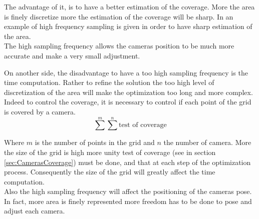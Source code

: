 %
The advantage of it, is to have a better estimation of the coverage. More the area is finely discretize more the estimation of the coverage will be sharp. In \citep{171*horster2006} an example of high frequency sampling is given in order to have sharp estimation of the area. \\
The high sampling frequency allows the cameras position to be much more accurate and make a very small adjustment.


On another side, the disadvantage to have a too high sampling frequency is the time computation. Rather to refine the solution the too high level of discretization of the area will make the optimization too long and more complex. Indeed to control the coverage, it is necessary to control if each point of the grid is covered by a camera.  
\begin{equation} 
	\sum^m \sum^n \mbox{test of coverage}
\end{equation}

Where $m$ is the number of points in the grid and $n$ the number of camera. 
 More the size of the grid is high more unity test of coverage (see in section \ref{sec:CamerasCoverage}) must be done, and that at each step of the optimization process.  Consequently the size of the grid will greatly affect the time computation.  \\
Also the high sampling frequency will affect the positioning of the cameras pose. In fact, more area is finely represented more freedom has to be done to pose and adjust each camera. 



